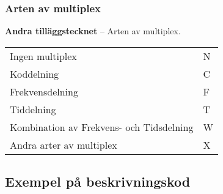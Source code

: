 \subsubsection{Arten av multiplex}
\textbf{Andra tilläggstecknet} -- Arten av multiplex.\\
\begin{tabular}{ll}
	Ingen multiplex & N\\
	Koddelning & C\\
	Frekvensdelning & F\\
	Tiddelning & T\\
	Kombination av Frekvens- och Tidsdelning & W\\
	Andra arter av multiplex & X\\
\end{tabular}


\subsection{Exempel på beskrivningskod}
